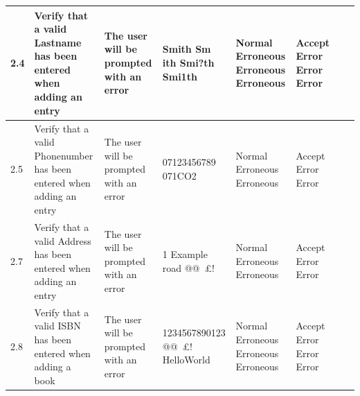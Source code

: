 \begin{landscape}
\begin{center}
\begin{longtable}{|p{1.5cm}|p{2cm}|p{2.5cm}|p{2.5cm}|p{2cm}|p{2cm}|p{2cm}|p{2cm}|}
        2.4 & Verify that a valid Lastname has been entered when adding an entry & The user will be prompted with an error & Smith \newline Sm ith \newline Smi?th \newline Smi1th & Normal \newline Erroneous \newline Erroneous \newline Erroneous & Accept \newline Error \newline Error \newline Error & & \\ \hline
        2.5 & Verify that a valid Phonenumber has been entered when adding an entry & The user will be prompted with an error & 07123456789 \newline 07123123.3 \newline 071CO2 & Normal \newline Erroneous \newline Erroneous & Accept \newline Error \newline Error & & \\ \hline
        2.7 & Verify that a valid Address has been entered when adding an entry & The user will be prompted with an error & 1 Example road \newline @@~£! \newline 1231231 & Normal \newline Erroneous \newline Erroneous & Accept \newline Error \newline Error & & \\ \hline
        2.8 & Verify that a valid ISBN has been entered when adding a book & The user will be prompted with an error & 1234567890123 \newline @@~£! \newline 123 \newline HelloWorld & Normal \newline Erroneous \newline Erroneous \newline Erroneous & Accept \newline Error \newline Error \newline Error & & \\ \hline

\end{longtable}
\end{center}
\end{landscape}
